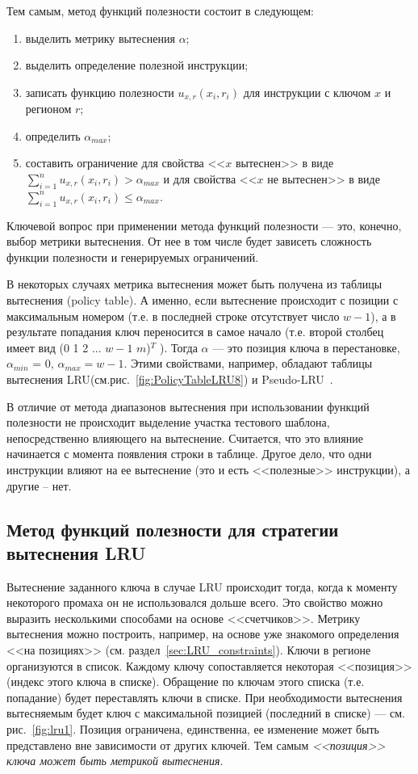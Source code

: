 \documentclass[14pt]{extreport}
\newcommand{\LRU}{\textsf{LRU}\xspace}
\newcommand{\PseudoLRU}{\textsf{Pseudo-LRU}\xspace}
\begin{document}
Тем самым, метод функций полезности состоит в следующем:
\begin{enumerate}
  \item выделить метрику вытеснения $\alpha$;
  \item выделить определение полезной инструкции;
  \item записать функцию полезности $u_{x,r}(x_i, r_i)$ для инструкции с ключом $x$ и регионом $r$;
  \item определить $\alpha_{max}$;
  \item составить ограничение для свойства <<$x$ вытеснен>> в виде $\sum\limits_{i=1}^n u_{x,r}(x_i, r_i) > \alpha_{max}$ и для свойства <<$x$ не вытеснен>> в виде $\sum\limits_{i=1}^n u_{x,r}(x_i,r_i) \leqslant \alpha_{max}$.
\end{enumerate}

Ключевой вопрос при применении метода функций полезности --- это, конечно, выбор метрики вытеснения. От нее в том числе будет зависеть сложность функции полезности и генерируемых ограничений.

В некоторых случаях метрика вытеснения может быть получена из таблицы вытеснения (policy table). А именно, если вытеснение происходит с позиции с максимальным номером (т.е. в последней строке отсутствует число $w-1$), а в результате попадания ключ переносится в самое начало (т.е. второй столбец имеет вид (0 1 2 ... $w-1$ $m$)$^T$ ). Тогда $\alpha$ --- это позиция ключа в перестановке, $\alpha_{min}$ = 0, $\alpha_{max} = w{-}1$. Этими свойствами, например, обладают таблицы вытеснения \LRU (см.рис.~\ref{fig:PolicyTableLRU8}) и \PseudoLRU~\cite{policy_tables}.

В отличие от метода диапазонов вытеснения при использовании функций полезности не происходит выделение участка тестового шаблона, непосредственно влияющего на вытеснение. Считается, что это влияние начинается с момента появления строки в таблице. Другое дело, что одни инструкции влияют на ее вытеснение (это и есть <<полезные>> инструкции), а другие -- нет.


\subsection{Метод функций полезности для стратегии вытеснения \LRU}

Вытеснение заданного ключа в случае \LRU происходит тогда, когда к моменту некоторого промаха он не использовался дольше всего. Это свойство можно выразить несколькими способами на основе <<счетчиков>>. Метрику вытеснения можно построить, например, на основе уже знакомого определения <<на позициях>> (см. раздел~\ref{sec:LRU_constraints}). Ключи в регионе организуются в список. Каждому ключу сопоставляется некоторая <<позиция>> (индекс этого ключа в списке). Обращение по ключам этого списка (т.е. попадание) будет переставлять ключи в списке. При необходимости вытеснения вытесняемым будет ключ с максимальной позицией (последний в списке) --- см. рис.~\ref{fig:lru1}. Позиция ограничена, единственна, ее изменение может быть представлено вне зависимости от других ключей. Тем самым \emph{<<позиция>> ключа может быть метрикой вытеснения}.
\end{document}
